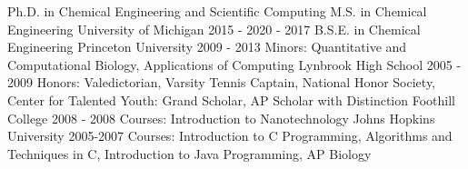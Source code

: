 

\begin{cventries}
  \cventry
    {Ph.D. in Chemical Engineering and Scientific Computing \linebreak M.S. in Chemical Engineering} %
    {University of Michigan} %
    {} %
    {2015 - 2020  - 2017} %
    {
    }
  \cventry
    {B.S.E. in Chemical Engineering} %
    {Princeton University} %
    {} %
    {2009 - 2013} %
    {\scriptsize Minors: Quantitative and Computational Biology, Applications of Computing
    }
\ifoutdated
  \cventry
    {} %
    {Lynbrook High School} %
    {} %
    {2005 - 2009} %
    {\scriptsize Honors: Valedictorian, Varsity Tennis Captain, National Honor Society, Center for Talented Youth: Grand Scholar, AP Scholar with Distinction
    }
  \cventry
    {} %
    {Foothill College} %
    {} %
    {2008 - 2008} %
    {\scriptsize Courses: Introduction to Nanotechnology
    }
  \cventry
    {} %
    {Johns Hopkins University} %
    {} %
    {2005-2007} %
    {\scriptsize Courses: Introduction to C Programming, Algorithms and Techniques in C, Introduction to Java Programming, AP Biology
    }
\fi
\end{cventries}
